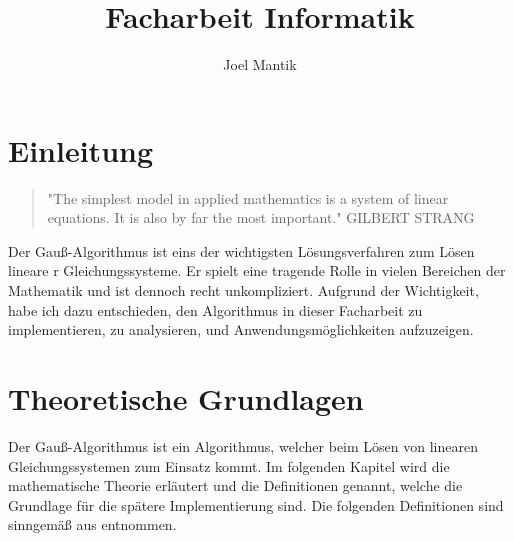 \documentclass[a4paper, 12pt]{report}
\title{Facharbeit Informatik}
\author{Joel Mantik}
\begin{document}
\maketitle
\begin{sloppypar}
\tableofcontents

\chapter{Einleitung}
\begin{quote}
    "The simplest model in applied mathematics is a system of linear equations. It is also by far the most important."
    \newline GILBERT STRANG
\end{quote}
Der Gauß-Algorithmus ist eins der wichtigsten Lösungsverfahren zum Lösen lineare
r Gleichungssysteme.
Er spielt eine tragende Rolle in vielen Bereichen der Mathematik und ist dennoch  recht unkompliziert.
    Aufgrund der Wichtigkeit, habe ich dazu entschieden, den Algorithmus in dieser
Facharbeit zu implementieren,
zu analysieren, und Anwendungsmöglichkeiten aufzuzeigen.

\chapter{Theoretische Grundlagen}
Der Gauß-Algorithmus ist ein Algorithmus, welcher beim Lösen von linearen Gleichungssystemen zum Einsatz kommt. Im folgenden Kapitel wird die mathematische
Theorie erläutert und die Definitionen genannt, welche die Grundlage für die spätere Implementierung sind.
Die folgenden Definitionen sind sinngemäß aus \cite{1} entnommen.

\end{sloppypar}
\end{document}
